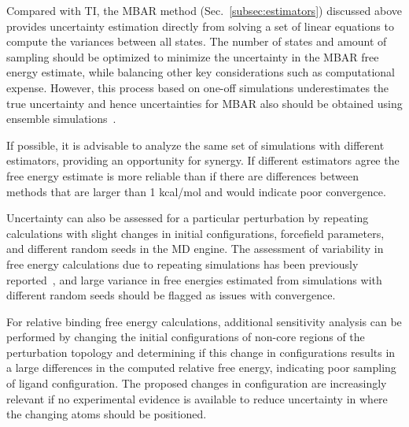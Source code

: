 \documentclass[9pt,bestpractices]{livecoms}
\begin{document}
Compared with TI, the MBAR method (Sec.~\ref{subsec:estimators}) discussed above provides uncertainty estimation directly from solving a set of linear equations to compute the variances between all states. 
The number of states and amount of sampling should be optimized to minimize the uncertainty in the MBAR free energy estimate, while balancing other key considerations such as computational expense. 
However, this process based on one-off simulations underestimates the true uncertainty and hence uncertainties for MBAR also should be obtained using ensemble simulations~\cite{bhati2018, wade2022}.

If possible, it is advisable to analyze the same set of simulations with different estimators, providing an opportunity for synergy. If different estimators agree the free energy estimate is more reliable than if there are differences between methods that are larger than 1 kcal/mol and would indicate poor convergence. 

Uncertainty can also be assessed for a particular perturbation by repeating calculations with slight changes in initial configurations, forcefield parameters, and different random seeds in the MD engine. 
The assessment of variability in free energy calculations due to repeating simulations has been previously reported~\cite{aldeghi2019accurate,paliwal2011benchmark,mey2016blinded,mey2018impact}, and large variance in free energies estimated from simulations with different random seeds should be flagged as issues with convergence. 

For relative binding free energy calculations, additional sensitivity analysis can be performed by changing the initial configurations of non-core regions of the perturbation topology and determining if this change in configurations results in a large differences in the computed relative free energy, indicating poor sampling of ligand configuration.
The proposed changes in configuration are increasingly relevant if no experimental evidence is available to reduce uncertainty in where the changing atoms should be positioned.
\end{document}

